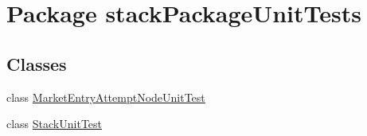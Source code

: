 \hypertarget{namespacestack_package_unit_tests}{\section{Package stack\+Package\+Unit\+Tests}
\label{namespacestack_package_unit_tests}
}
\subsection*{Classes}
\begin{DoxyCompactItemize}
\item 
class \hyperlink{classstack_package_unit_tests_1_1_market_entry_attempt_node_unit_test}{Market\+Entry\+Attempt\+Node\+Unit\+Test}
\item 
class \hyperlink{classstack_package_unit_tests_1_1_stack_unit_test}{Stack\+Unit\+Test}
\end{DoxyCompactItemize}
